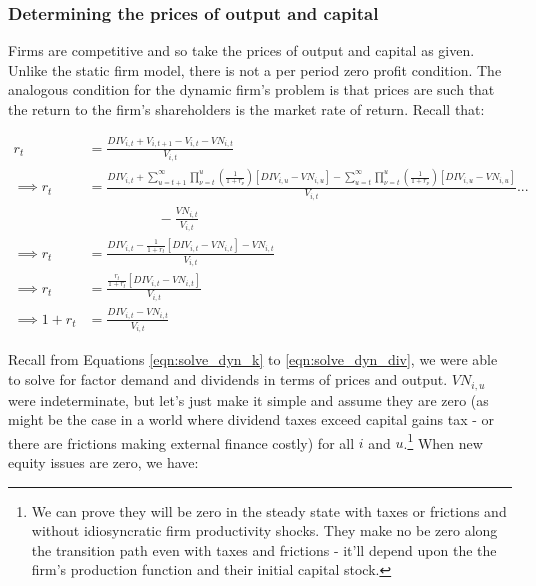 \documentclass[letterpaper,12pt]{article}
\theoremstyle{definition}
\begin{document}
\begin{spacing}{1.5}
\subsubsection*{Determining the prices of output and capital}

Firms are competitive and so take the prices of output and capital as given.  Unlike the static firm model, there is not a per period zero profit condition.  The analogous condition for the dynamic firm's problem is that prices are such that the return to the firm's shareholders is the market rate of return.  Recall that:

\begin{equation}
\begin{split}
r_{t} &= \frac{DIV_{i,t}+V_{i,t+1}-V_{i,t}-VN_{i,t}}{V_{i,t}}\\
\implies r_{t} &= \frac{DIV_{i,t} + \sum_{u=t+1}^{\infty}\prod_{\nu=t}^{u}\left(\frac{1}{1+r_{\nu}}\right)\left[DIV_{i,u}-VN_{i,u}\right] -\sum_{u=t}^{\infty}\prod_{\nu=t}^{u}\left(\frac{1}{1+r_{\nu}}\right)\left[DIV_{i,u}-VN_{i,u}\right]}{V_{i,t}} ...\\
& \quad\quad\quad\quad\quad - \frac{VN_{i,t}}{V_{i,t}} \\
\implies r_{t} & = \frac{DIV_{i,t} - \frac{1}{1+r_{t}}\left[DIV_{i,t} - VN_{i,t}\right] - VN_{i,t}}{V_{i,t}} \\
\implies r_{t} & = \frac{\frac{r_{t}}{1+r_{t}}\left[DIV_{i,t}-VN_{i,t}\right]}{V_{i,t}} \\
\implies 1+r_{t} &= \frac{DIV_{i,t}-VN_{i,t}}{V_{i,t}}
\end{split}
\end{equation}

Recall from Equations \ref{eqn:solve_dyn_k} to \ref{eqn:solve_dyn_div}, we were able to solve for factor demand and dividends in terms of prices and output.  $VN_{i,u}$ were indeterminate, but let's just make it simple and assume they are zero (as might be the case in a world where dividend taxes exceed capital gains tax - or there are frictions making external finance costly) for all $i$ and $u$.\footnote{We can prove they will be zero in the steady state with taxes or frictions and without idiosyncratic firm productivity shocks.  They make no be zero along the transition path even with taxes and frictions - it'll depend upon the the firm's production function and their initial capital stock.}  When new equity issues are zero, we have:


\end{spacing}
\end{document}
